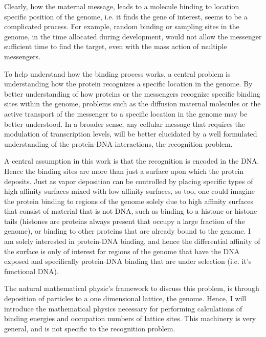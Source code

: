   Clearly, how the maternal message, leads to a molecule binding to location specific position of the genome, i.e. it finds the gene of interest, seems to be a complicated process.  For example, random binding or sampling sites in the genome, in the time allocated during development, would not allow the messenger sufficient time to find the target, even with the mass action of multiple messengers.  
  
  To help understand how the binding process works, a central problem is understanding how the protein recognizes a specific location in the genome.  By better understanding of how proteins or the messengers recognize specific binding sites within the genome, problems such as the diffusion maternal molecules or the active transport of the messenger to a specific location in the genome may be better understood.  In a broader sense, any cellular message that requires the modulation of transcription levels, will be better elucidated by a well formulated understanding of the protein-DNA interactions, the recognition problem.
   
   A central assumption in this work is that the recognition is encoded in the DNA.  Hence the binding sites are more than just a surface upon which the protein deposits.  Just as vapor deposition can be controlled by placing specific types of high affinity surfaces mixed with low affinity surfaces, so too, one could imagine the protein binding to regions of the genome solely due to high affinity surfaces that consist of material that is not DNA, such as binding to a histone or histone tails (histones are proteins always present that occupy a large fraction of the genome), or binding to other proteins that are already bound to the genome.  I am solely interested in protein-DNA binding, and hence the differential affinity of the surface is only of interest for regions of the genome that have the DNA exposed and specifically protein-DNA binding that are under selection (i.e. it's functional DNA).  
   
   The natural mathematical physic's framework to discuss this problem, is through deposition of particles to a one dimensional lattice, the genome.  Hence, I will introduce the mathematical physics necessary for performing calculations of binding energies and occupation numbers of lattice sites.  This machinery is very general, and is not specific to the recognition problem.  

